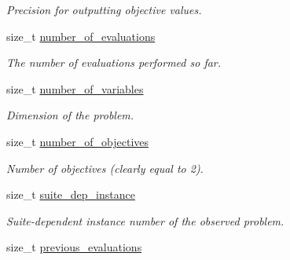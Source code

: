\begin{DoxyCompactItemize}
\begin{DoxyCompactList}\small\item\em Precision for outputting objective values. \end{DoxyCompactList}\item 
size\+\_\+t \hyperlink{structlogger__biobj__data__t_a32a17eebfdedb7273fb42145ab84e2cd}{number\+\_\+of\+\_\+evaluations}\hypertarget{structlogger__biobj__data__t_a32a17eebfdedb7273fb42145ab84e2cd}{}\label{structlogger__biobj__data__t_a32a17eebfdedb7273fb42145ab84e2cd}

\begin{DoxyCompactList}\small\item\em The number of evaluations performed so far. \end{DoxyCompactList}\item 
size\+\_\+t \hyperlink{structlogger__biobj__data__t_a93e98a7e4bd2dfb1ffb31a3c75ee8a2d}{number\+\_\+of\+\_\+variables}\hypertarget{structlogger__biobj__data__t_a93e98a7e4bd2dfb1ffb31a3c75ee8a2d}{}\label{structlogger__biobj__data__t_a93e98a7e4bd2dfb1ffb31a3c75ee8a2d}

\begin{DoxyCompactList}\small\item\em Dimension of the problem. \end{DoxyCompactList}\item 
size\+\_\+t \hyperlink{structlogger__biobj__data__t_a3f8a12e56f3f243ba3aee552a39b6d7e}{number\+\_\+of\+\_\+objectives}\hypertarget{structlogger__biobj__data__t_a3f8a12e56f3f243ba3aee552a39b6d7e}{}\label{structlogger__biobj__data__t_a3f8a12e56f3f243ba3aee552a39b6d7e}

\begin{DoxyCompactList}\small\item\em Number of objectives (clearly equal to 2). \end{DoxyCompactList}\item 
size\+\_\+t \hyperlink{structlogger__biobj__data__t_aac9851392502aa3c5f3e7104c11ac711}{suite\+\_\+dep\+\_\+instance}\hypertarget{structlogger__biobj__data__t_aac9851392502aa3c5f3e7104c11ac711}{}\label{structlogger__biobj__data__t_aac9851392502aa3c5f3e7104c11ac711}

\begin{DoxyCompactList}\small\item\em Suite-\/dependent instance number of the observed problem. \end{DoxyCompactList}\item 
size\+\_\+t \hyperlink{structlogger__biobj__data__t_a002f1f1b605182509c7ab70128f2f242}{previous\+\_\+evaluations}\hypertarget{structlogger__biobj__data__t_a002f1f1b605182509c7ab70128f2f242}{}\label{structlogger__biobj__data__t_a002f1f1b605182509c7ab70128f2f242}


\end{DoxyCompactItemize}
